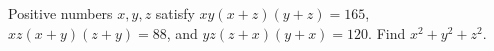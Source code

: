 Positive numbers $x,y,z$ satisfy $xy(x+z)(y+z)=165$, $xz(x+y)(z+y)=88$, and $yz(z+x)(y+x)=120$. Find $x^2+y^2+z^2$.
